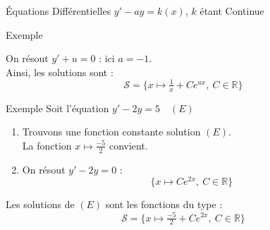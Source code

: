 \documentclass{cours}
\begin{document}
\begin{Gpartie}{Équations Différentielles $y'-ay=k(x)$, $k$ étant Continue}
\begin{Spartie}{Exemple}
\begin{enumerate}
                On résout $y'+u=0$ : ici $a=-1$. \\
                Ainsi, les solutions sont :
                \[\mathcal{S}=\Big\{x\mapsto\tfrac{1}{x}+Ce^{ax},\ C\in\mathbb{R}\Big\}\]
            \end{enumerate}
        \end{Spartie}
        \begin{Spartie}{Exemple} 
            Soit l'équation $y'-2y=5\quad(E)$
            \begin{enumerate}
                \item Trouvons une fonction constante solution $(E)$. \\
                La fonction $x\mapsto\frac{-5}{2}$ convient.
                \item On résout $y'-2y=0$ :
                \[\Big\{x\mapsto Ce^{2x},\ C\in\mathbb{R}\Big\}\]
            \end{enumerate}

            Les solutions de $(E)$ sont les fonctions du type :
            \[\mathcal{S}=\Big\{x\mapsto\tfrac{-5}{2}+Ce^{2x},\ C\in\mathbb{R}\Big\}\]
        \end{Spartie}
    \end{Gpartie}
\end{document}

